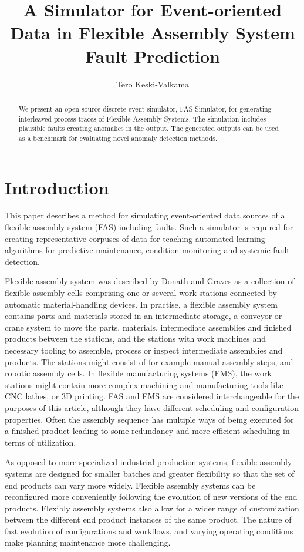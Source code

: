 \documentclass[procedia]{easychair}
\institute{Faculty of Computing and Electrical Engineering, Tampere University of Technology, Finland}
\title{A Simulator for Event-oriented Data in Flexible Assembly System Fault Prediction}
\author{Tero Keski-Valkama}
\begin{document}
\maketitle


\begin{abstract}
We present an open source discrete event simulator, FAS Simulator, for generating interleaved process traces of Flexible Assembly Systems. The simulation includes plausible faults creating anomalies in the output.
The generated outputs can be used as a benchmark for evaluating novel anomaly detection methods.
\end{abstract}

\section{Introduction}
This paper describes a method for simulating event-oriented data sources of a flexible assembly system (FAS) including faults. Such a simulator is required for creating representative corpuses
of data for teaching automated learning algorithms for predictive maintenance, condition monitoring and systemic fault detection.

Flexible assembly system was described by Donath and Graves \cite{donath1988flexible} as a collection of flexible assembly cells comprising one or several work stations connected by automatic material-handling devices.
In practise, a flexible assembly system contains parts and materials stored in an intermediate storage,
a conveyor or crane system to move the parts, materials, intermediate assemblies and finished products between the stations, and the stations with work machines and necessary tooling
to assemble, process or inspect intermediate assemblies and products. The stations might consist of for example manual assembly steps, and robotic assembly cells. In flexible manufacturing systems (FMS),
the work stations might contain more complex machining and manufacturing tools like CNC lathes, or 3D printing. FAS and FMS are considered interchangeable for the purposes of this article, although
they have different scheduling and configuration properties.
Often the assembly sequence has multiple ways of being executed for a finished product leading to some redundancy and more efficient scheduling in terms of utilization.

As opposed to more specialized industrial production systems, flexible assembly systems are designed for smaller batches and greater flexibility so that the set of end products can vary more widely.
Flexible assembly systems can be reconfigured more conveniently following the evolution of new versions of the end products. Flexibly assembly systems also allow for a wider range
of customization between the different end product instances of the same product. The nature of fast evolution of configurations and workflows, and varying operating conditions make
planning maintenance more challenging.
\end{document}
